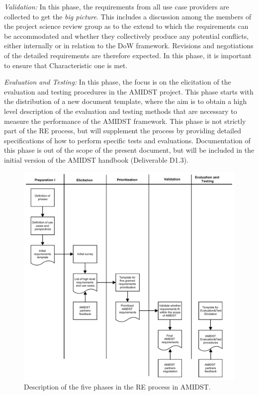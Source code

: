\emph{Validation:} In this phase, the requirements from all use case providers are collected to get the \emph{big
  picture}.  This includes a discussion among the members of the  project science review group as to the extend to which 
the
requirements can be accommodated and whether they collectively produce any potential conflicts, either internally or in
relation to the
DoW framework. Revisions and negotiations of the detailed requirements are therefore expected.  In this phase, it is 
important to ensure that Characteristic one is met.

 \emph{Evaluation and Testing:} In this phase, the focus is on the elicitation of the evaluation and testing procedures
 in the AMIDST project. This phase starts with the distribution of a new document template, where the aim is to obtain a
 high level description of the evaluation and testing methods that are necessary to measure the performance of the AMIDST
 framework. This phase is not strictly part of the RE process, but will supplement the process by providing
 detailed specifications of how to perform specific tests and evaluations. Documentation of this phase is out of the scope of 
the present document, but will
 be included in the initial version of the AMIDST handbook (Deliverable D1.3).    


\begin{figure}[htbp]
\centering
\includegraphics [keepaspectratio,width = 14cm] {amidst_re}
\caption{Description of the five phases in the RE process in AMIDST.}
\label{REprocess1}
\end{figure}



